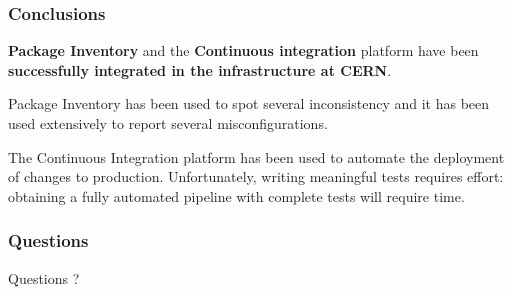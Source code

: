 \documentclass[aspectratio=169]{beamer}
\begin{document}
\begin{frame}
    \frametitle{Conclusions}

    \textbf{Package Inventory} and the \textbf{Continuous integration}
    platform have been \textbf{successfully integrated in the
    infrastructure at CERN}.

    Package Inventory has been used to spot several inconsistency and it has
    been used extensively to report several misconfigurations.

    The Continuous Integration platform has been used to automate the
    deployment of changes to production. Unfortunately, writing meaningful
    tests requires effort: obtaining a fully automated pipeline with complete
    tests will require time.
\end{frame}


\begin{frame}
    \frametitle{Questions}

\begin{center}
\Huge Questions ?
\end{center}
\end{frame}
\end{document}
